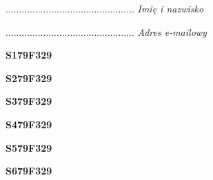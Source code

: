 \begin{turn}{90}\begin{minipage}{\linewidth} \vspace{20mm} ................................................  \textit{Imię i nazwisko}\end{minipage}\end{turn}

\begin{turn}{90}\begin{minipage}{\linewidth} \vspace{20mm} ................................................  \textit{Adres e-mailowy}\end{minipage}\end{turn}

\begin{turn}{90}\huge \begin{minipage}{\linewidth} \vspace{10mm}\textbf{S179F329}\end{minipage}\end{turn}

\begin{turn}{90}\huge \begin{minipage}{\linewidth} \vspace{10mm}\textbf{S279F329}\end{minipage}\end{turn}

\begin{turn}{90}\huge \begin{minipage}{\linewidth} \vspace{10mm}\textbf{S379F329}\end{minipage}\end{turn}

\begin{turn}{90}\huge \begin{minipage}{\linewidth} \vspace{10mm}\textbf{S479F329}\end{minipage}\end{turn}

\begin{turn}{90}\huge \begin{minipage}{\linewidth} \vspace{10mm}\textbf{S579F329}\end{minipage}\end{turn}

\begin{turn}{90}\huge \begin{minipage}{\linewidth} \vspace{10mm}\textbf{S679F329}\end{minipage}\end{turn}


